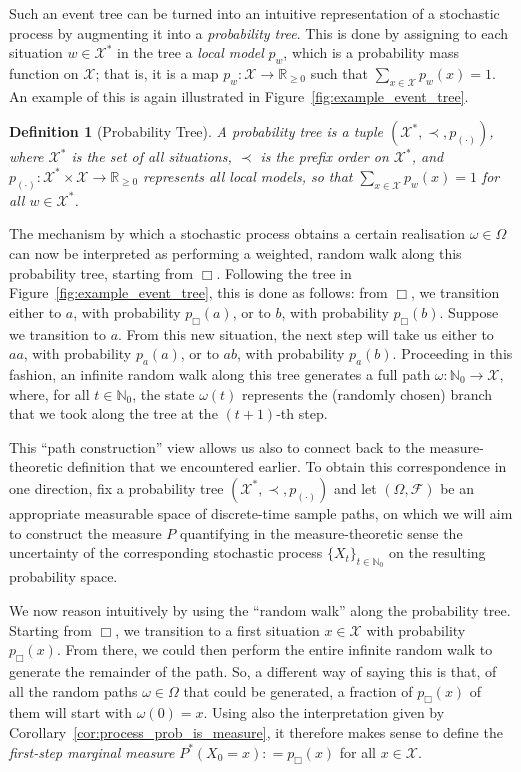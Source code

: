 \documentclass[11pt]{book}
\newtheorem{definition}{Definition}
\newcommand{\nats}{\mathbb{N}}
\newcommand{\natswith}{\nats_{0}}
\newcommand{\reals}{\mathbb{R}}
\newcommand{\realsnonneg}{\reals_{\geq 0}}
\newcommand{\states}{\mathcal{X}}
\newcommand{\coloneqq}{:\!=}
\begin{document}
Such an event tree can be turned into an intuitive representation of a stochastic process by augmenting it into a \emph{probability tree}. This is done by assigning to each situation $w\in\states^*$ in the tree a \emph{local model} $p_{w}$, which is a probability mass function on $\states$; that is, it is a map $p_w:\states\to\realsnonneg$ such that $\sum_{x\in\states}p_w(x)=1$. An example of this is again illustrated in Figure~\ref{fig:example_event_tree}.
\begin{definition}[Probability Tree]\label{def:prob_tree}
A probability tree is a tuple $(\states^*,\prec,p_{(\cdot)})$, where $\states^*$ is the set of all situations, $\prec$ is the prefix order on $\states^*$, and $p_{(\cdot)}:\states^*\times\states\to\realsnonneg$ represents all local models, so that $\sum_{x\in\states}p_w(x)=1$ for all $w\in\states^*$.
\end{definition}

The mechanism by which a stochastic process obtains a certain realisation $\omega\in\Omega$ can now be interpreted as performing a weighted, random walk along this probability tree, starting from $\Box$. Following the tree in Figure~\ref{fig:example_event_tree}, this is done as follows: from $\Box$, we transition either to $a$, with probability $p_\Box(a)$, or to $b$, with probability $p_\Box(b)$. Suppose we transition to $a$. From this new situation, the next step will take us either to $aa$, with probability $p_a(a)$, or to $ab$, with probability $p_a(b)$. Proceeding in this fashion, an infinite random walk along this tree generates a full path $\omega:\natswith\to\states$, where, for all $t\in\natswith$, the state $\omega(t)$ represents the (randomly chosen) branch that we took along the tree at the $(t+1)$-th step.

This ``path construction'' view allows us also to connect back to the measure-theoretic definition that we encountered earlier. To obtain this correspondence in one direction, fix a probability tree $(\states^*,\prec, p_{(\cdot)})$ and let $(\Omega,\mathcal{F})$ be an appropriate measurable space of discrete-time sample paths, on which we will aim to construct the measure $P$ quantifying in the measure-theoretic sense the uncertainty of the corresponding stochastic process $\{X_t\}_{t\in\natswith}$ on the resulting probability space.

We now reason intuitively by using the ``random walk'' along the probability tree. Starting from $\Box$, we transition to a first situation $x\in\states$ with probability $p_\Box(x)$. From there, we could then perform the entire infinite random walk to generate the remainder of the path. So, a different way of saying this is that, of all the random paths $\omega\in\Omega$ that could be generated, a fraction of $p_\Box(x)$ of them will start with $\omega(0)=x$. Using also the interpretation given by Corollary~\ref{cor:process_prob_is_measure}, it therefore makes sense to define the \emph{first-step marginal measure} $P^*(X_0=x) \coloneqq p_\Box(x)$ for all $x\in\states$.
\end{document}
